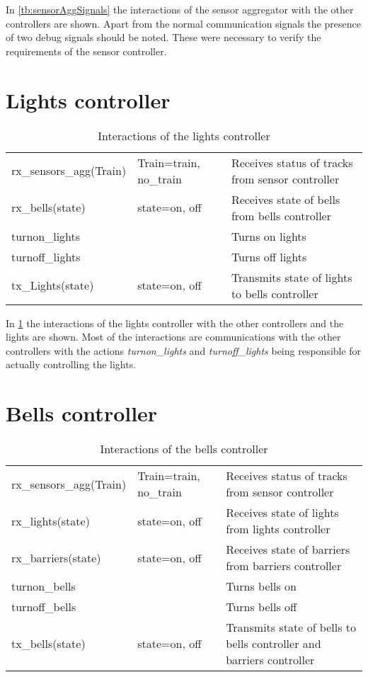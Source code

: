 \documentclass[final]{report}
\begin{document}
In \cref{tb:sensorAggSignals} the interactions of the sensor aggregator with the other controllers are shown. Apart from the normal communication signals the presence of two debug signals should be noted. These were necessary to verify the requirements of the sensor controller.

\section{Lights controller}
\begin{table}[H]
\centering
\begin{tabular}{|l|l|l|}
\hline
rx\_sensors\_agg(Train)  & Train=train, no\_train & Receives status of tracks from sensor controller \\
rx\_bells(state)   & state=on, off          & Receives state of bells from bells controller               \\ \hline
turnon\_lights &         & Turns on lights                                     \\
turnoff\_lights & & Turns off lights\\
tx\_Lights(state)  & state=on, off          & Transmits state of lights to bells controller               \\ \hline
\end{tabular}
\caption{Interactions of the lights controller}
\label{tb:lightsSignals}
\end{table}

In \cref{tb:lightsSignals} the interactions of the lights controller with the other controllers and the lights are shown. Most of the interactions are communications with the other controllers with the actions \textit{turnon\_lights} and \textit{turnoff\_lights} being responsible for actually controlling the lights.

\section{Bells controller}
\begin{table}[H]
\centering
\begin{tabular}{|l|l|l|}
\hline
rx\_sensors\_agg(Train)   & Train=train, no\_train & Receives status of tracks from sensor controller           \\
rx\_lights(state)   & state=on, off          & Receives state of lights from lights controller                      \\
rx\_barriers(state) & state=on, off          & Receives state of barriers from barriers controller                  \\ \hline
turnon\_bells   &          & Turns bells on                                              \\
turnoff\_bells   &          & Turns bells off                                              \\
tx\_bells(state)    & state=on, off          & Transmits state of bells to bells controller and barriers controller\\ \hline
\end{tabular}
\caption{Interactions of the bells controller}
\label{tb:bellsSignals}
\end{table}
\end{document}
